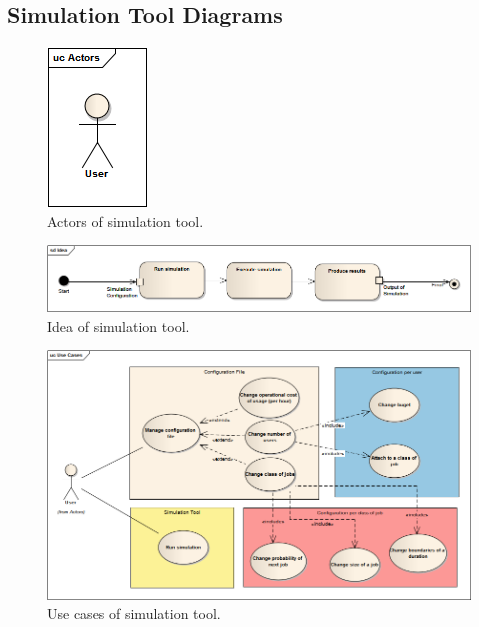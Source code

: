 \documentclass{report}
\begin{document}
\subsection{Simulation Tool Diagrams}
	\begin{figure}[!hbtp]
		\centering
		\includegraphics{../ea_files/generatedImages/Simulator/Actors.png}
		\caption{Actors of simulation tool.}
		\label{app:st:actors}
	\end{figure}
	\begin{figure}[!hbtp]
		\centering
		\includegraphics[width=\textwidth]{../ea_files/generatedImages/Simulator/Idea.png}
		\caption{Idea of simulation tool.}
		\label{app:st:idea}
	\end{figure}
	\begin{figure}[!hbtp]
		\centering
		\includegraphics[width=\textwidth, angle=90, scale=1.4]{../ea_files/generatedImages/Simulator/UseCases.png}
		\caption{Use cases of simulation tool.}
		\label{app:st:ucs}
	\end{figure}
\end{document}
